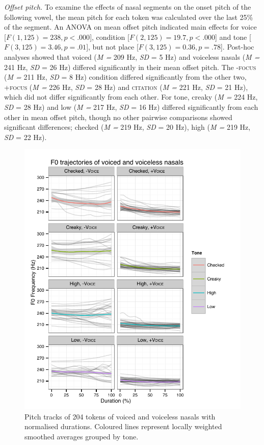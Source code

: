 \documentclass[12pt]{article}
\newcommand{\condc}{\textsc{citation }}
\newcommand{\condf}{\textsc{+focus }}
\newcommand{\condu}{\textsc{-focus }}
\begin{document}
\emph{Offset pitch.} To examine the effects of nasal segments on the onset pitch of the following vowel, the mean pitch for each token was calculated over the last 25\% of the segment. An ANOVA on mean offset pitch indicated main effects for voice [$F(1, 125) = 238, p < .000$], condition [$F(2, 125) = 19.7, p < .000$] and tone [$F(3, 125) = 3.46, p = .01$], but not place [$F(3, 125) = 0.36, p = .78$]. Post-hoc analyses showed that voiced (\emph{M = } 209 Hz, \emph{SD} = 5 Hz) and voiceless nasals (\emph{M = } 241 Hz, \emph{SD} = 26 Hz) differed significantly in their mean offset pitch. The \condu (\emph{M = } 211 Hz, \emph{SD} = 8 Hz) condition differed significantly from the other two, \condf (\emph{M = } 226 Hz, \emph{SD} = 28 Hz) and \condc (\emph{M = } 221 Hz, \emph{SD} = 21 Hz), which did not differ significantly from each other. For tone, creaky (\emph{M = } 224 Hz, \emph{SD} = 28 Hz) and low (\emph{M = } 217 Hz, \emph{SD} = 16 Hz) differed significantly from each other in mean offset pitch, though no other pairwise comparisons showed significant differences; checked (\emph{M = } 219 Hz, \emph{SD} = 20 Hz), high (\emph{M = } 219 Hz, \emph{SD} = 22 Hz).


\newpage
\begin{figure}[h!]
	\centering
	\includegraphics[scale=1.0]{figures/pitch.pdf}
	\caption{Pitch tracks of 204 tokens of voiced and voiceless nasals with normalised durations. Coloured lines represent locally weighted smoothed averages grouped by tone.}
	\label{fig:pitch}
\end{figure}
\end{document}
